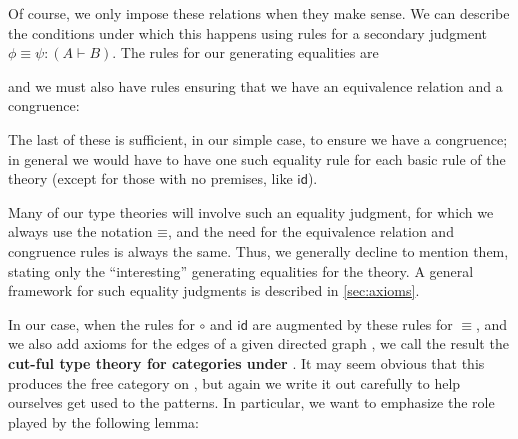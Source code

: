 \documentclass{book}
\def\idfunc{\mathsf{id}}
\def\equivsym{\mathord{\equiv}}
\let\types\vdash
\def\comp#1{\circ_{#1}}
\begin{document}
Of course, we only impose these relations when they make sense.
We can describe the conditions under which this happens using rules for a secondary judgment $\phi\equiv \psi : (A\types B)$.
The rules for our generating equalities are
and we must also have rules ensuring that we have an equivalence relation and a congruence:
The last of these is sufficient, in our simple case, to ensure we have a congruence; in general we would have to have one such equality rule for each basic rule of the theory (except for those with no premises, like $\idfunc$).

Many of our type theories will involve such an equality judgment, for which we always use the notation $\equivsym$, and the need for the equivalence relation and congruence rules is always the same.
Thus, we generally decline to mention them, stating only the ``interesting'' generating equalities for the theory.
A general framework for such equality judgments is described in \cref{sec:axioms}.

In our case, when the rules for $\circ$ and $\idfunc$ are augmented by these rules for $\equiv$, and we also add axioms for the edges of a given directed graph \cG, we call the result the \textbf{cut-ful type theory for categories under \cG}.
It may seem obvious that this produces the free category on \cG, but again we write it out carefully to help ourselves get used to the patterns.
In particular, we want to emphasize the role played by the following lemma:
\end{document}
